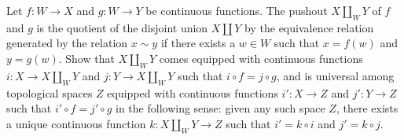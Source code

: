 \begin{exercise}
  Let \(f\colon W\to X\) and \(g\colon W\to Y\) be continuous
  functions. The pushout \(X\coprod_W Y\) of \(f\) and \(g\) is the
  quotient of the disjoint union \(X\coprod Y\) by the equivalence relation
  generated by the relation \(x\sim y\) if there exists a \(w\in W\) such
  that \(x=f(w)\) and \(y=g(w)\). Show that \(X\coprod_W Y\) comes equipped
  with continuous functions \(i\colon X\to X\coprod_W Y\) and
  \(j\colon Y\to X\coprod_W Y\) such that \(i\circ f=j\circ g\), and is
  universal among topological spaces \(Z\) equipped with continuous
  functions \(i'\colon X\to Z\) and \(j'\colon Y\to Z\) such that
  \(i'\circ f=j'\circ g\) in the following sense: given any such space
  \(Z\), there exists a unique continuous function
  \(k\colon X\coprod_W Y\to Z\) such that \(i'=k\circ i\) and \(j'=k\circ
  j\).
\end{exercise}
\begin{solution}
\end{solution}


